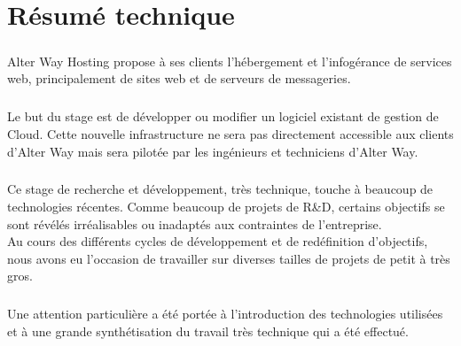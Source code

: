 \chapter*{Résumé technique}
\paragraph*{}
	Alter Way Hosting propose à ses clients l'hébergement et l'infogérance de
	services web, principalement de sites web et de serveurs de messageries.

\paragraph*{}
	Le but du stage est de développer ou modifier un logiciel existant de gestion
	de Cloud. Cette nouvelle infrastructure ne sera pas directement accessible
	aux clients d'Alter Way mais sera pilotée par les ingénieurs et techniciens
	d'Alter Way.

\paragraph*{}
	Ce stage de recherche et développement, très technique, touche à beaucoup de technologies récentes.
	Comme beaucoup de projets de R\&D, certains objectifs se sont révélés irréalisables ou inadaptés aux contraintes
	de l'entreprise.\\
	Au cours des différents cycles de développement et de redéfinition d'objectifs, nous avons eu l'occasion de travailler
	sur diverses tailles de projets de petit à très gros.

\paragraph*{}
	Une attention particulière a été portée à l'introduction des technologies utilisées et à une grande synthétisation du
	travail très technique qui a été effectué.

